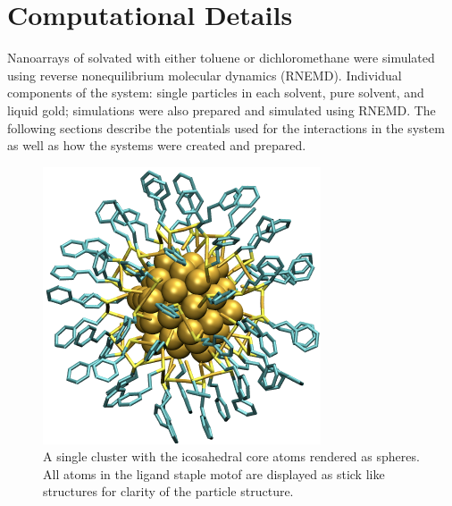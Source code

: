 \section{Computational Details}
Nanoarrays of  solvated with either toluene or dichloromethane were simulated using reverse nonequilibrium molecular dynamics (RNEMD).
Individual components of the system: single particles in each solvent, pure solvent, and liquid gold; simulations were also prepared and simulated using RNEMD.
The following sections describe the potentials used for the interactions in the system as well as how the systems were created and prepared.

\begin{figure}
    \centering
    \includegraphics[scale=3]{figures/Au144-part.pdf}
    \caption{A single  cluster with the icosahedral core atoms rendered as spheres. All atoms in the ligand staple motof are displayed as stick like structures for clarity of the particle structure.}
    \label{fig:single-part}
\end{figure}

